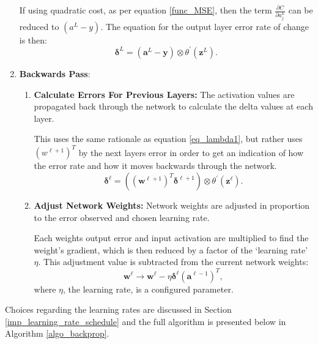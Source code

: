 \documentclass[a4paper,11pt,oneside]{article}
\theoremstyle{plain}
\theoremstyle{definition}
\begin{document}
\begin{enumerate}
		If using quadratic cost, as per equation \eqref{func_MSE}, then the term $\frac{\partial C}{\partial a_{j}^{L}}$ can be reduced to $(a^L - y)$. The equation for the output layer error rate of change is then:
		\begin{equation}\label{eq_lambda3}
		\mathbf{\delta}^L = (\mathbf{a}^L - \mathbf{y}) \otimes \theta^{\prime}(\mathbf{z}^L) .
		\end{equation}
		\newline		
		\item \textbf{Backwards Pass}: 
		\begin{enumerate}
			\item \textbf{Calculate Errors For Previous Layers:} The activation values are propagated back through the network to calculate the delta values at each layer. \newline
			
			This uses the same rationale as equation \eqref{eq_lambda1}, but rather uses $(w^{\ell+1})^T$ by the next layers error in order to get an indication of how the error rate and how it moves backwards through the network.
			\begin{equation}\label{eq_lambda4}
			\mathbf{\delta}^\ell = ((\mathbf{w}^{\ell+1})^T\mathbf{\delta}^{\ell+1})  \otimes \theta^{\prime}(\mathbf{z}^\ell) .
			\end{equation}
			
			\item \textbf{Adjust Network Weights:} Network weights are adjusted in proportion to the error observed and chosen learning rate.\newline
			
			Each weights output error and input activation are multiplied to find the weight’s gradient, which is then reduced by a factor of the ‘learning rate’ $\eta$. This adjustment value is subtracted from the current network weights:
			\begin{equation}\label{eq_bp_weightupdate}
			\mathbf{w}^\ell \rightarrow \mathbf{w}^\ell - {\eta}\mathbf{\delta}^{\ell} (\mathbf{a}^{\ell - 1})^T ,
			\end{equation}
			where $\eta$, the learning rate, is a configured parameter.
		\end{enumerate}
		
	\end{enumerate}
	
	Choices regarding the learning rates are discussed in Section \ref{imp_learning_rate_schedule} and the full algorithm is presented below in Algorithm \ref{algo_backprop}.\newline
	
\end{document}
